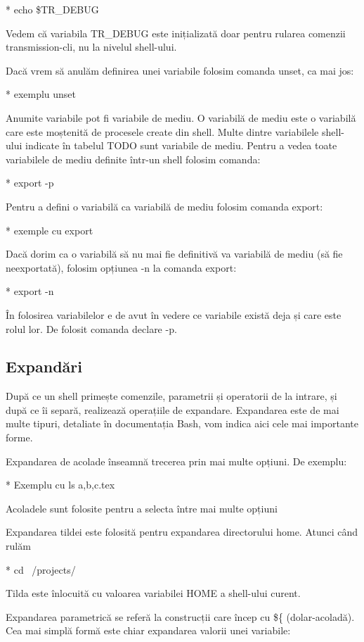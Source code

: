 * echo \$TR_DEBUG

Vedem că variabila TR_DEBUG este inițializată doar pentru rularea comenzii
transmission-cli, nu la nivelul shell-ului.

Dacă vrem să anulăm definirea unei variabile folosim comanda unset, ca mai jos:

* exemplu unset

Anumite variabile pot fi variabile de mediu. O variabilă de mediu este o
variabilă care este moștenită de procesele create din shell. Multe dintre
variabilele shell-ului indicate în tabelul TODO sunt variabile de mediu. Pentru
a vedea toate variabilele de mediu definite într-un shell folosim comanda:

* export -p

Pentru a defini o variabilă ca variabilă de mediu folosim comanda export:

* exemple cu export

Dacă dorim ca o variabilă să nu mai fie definitivă va variabilă de mediu (să fie
neexportată), folosim opțiunea -n la comanda export:

* export -n

În folosirea variabilelor e de avut în vedere ce variabile există deja și care
este rolul lor. De folosit comanda declare -p.

\subsection{Expandări}
\label{sec:cli-expansion}

După ce un shell primește comenzile, parametrii și operatorii de la intrare, și
după ce îi separă, realizează operațiile de expandare. Expandarea este de mai
multe tipuri, detaliate în documentația Bash, vom indica aici cele mai
importante forme.

Expandarea de acolade înseamnă trecerea prin mai multe opțiuni. De exemplu:

* Exemplu cu ls {a,b,c}.tex

Acoladele sunt folosite pentru a selecta între mai multe opțiuni

Expandarea tildei este folosită pentru expandarea directorului home. Atunci când
rulăm

* cd ~/projects/

Tilda este înlocuită cu valoarea variabilei HOME a shell-ului curent.

Expandarea parametrică se referă la construcții care încep cu \$\{
(dolar-acoladă). Cea mai simplă formă este chiar expandarea valorii unei
variabile:

